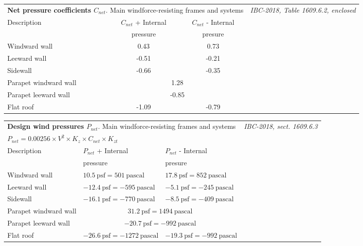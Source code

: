\vspace{5mm}

\begin{tabular}{lcc|p{5cm}}
\multicolumn{3}{p{8cm}|}{\textbf{Net pressure coefficients $C_{net}$}. Main windforce-resisting frames and systems} & \emph{IBC-2018, Table 1609.6.2, enclosed} \\
Description & $C_{net}$ + Internal & $C_{net}$ - Internal & \\
 & pressure &  presure & \\
 \cline{1-3}
Windward wall & 0.43 & 0.73 & \\
Leeward wall & -0.51 & -0.21 & \\
Sidewall & -0.66 & -0.35 & \\
Parapet windward wall & \multicolumn{2}{c|}{1.28} & \\
Parapet leeward wall & \multicolumn{2}{c|}{-0.85} & \\
Flat roof & -1.09 & -0.79 & \\
\end{tabular}

\vspace{5mm}

\begin{tabular}{lp{4cm}p{4cm}|p{2cm}}
\multicolumn{3}{l|}{\textbf{Design wind pressures $P_{net}$}. Main windforce-resisting frames and systems} & \emph{IBC-2018, sect. 1609.6.3} \\
\multicolumn{3}{p{8cm}|}{$P_{net} = 0.00256 \times V^2 \times K_z \times C_{net} \times K_{zt}$} & \\
Description & $P_{net}$ + Internal & $P_{net}$ - Internal & \\
 & pressure &  presure & \\
 \cline{1-3}
Windward wall & $10.5\ \mathrm{psf} =  501\ \mathrm{pascal}$ & $17.8\ \mathrm{psf} =  852\ \mathrm{pascal}$  & \\
Leeward wall & $-12.4\ \mathrm{psf} =  -595\ \mathrm{pascal}$  & $-5.1\ \mathrm{psf} =  -245\ \mathrm{pascal}$  & \\
Sidewall & $-16.1\ \mathrm{psf} =  -770\ \mathrm{pascal}$  & $-8.5\ \mathrm{psf} =  -409\ \mathrm{pascal}$  & \\
Parapet windward wall & \multicolumn{2}{c|}{$31.2\ \mathrm{psf} =  1494\ \mathrm{pascal}$ } & \\
Parapet leeward wall & \multicolumn{2}{c|}{$-20.7\ \mathrm{psf} =  -992\ \mathrm{pascal}$ } & \\
Flat roof & $-26.6\ \mathrm{psf} =  -1272\ \mathrm{pascal}$  & $-19.3\ \mathrm{psf} =  -992\ \mathrm{pascal}$  & \\
\end{tabular}

